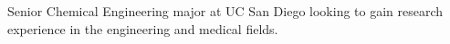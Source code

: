 \begin{cvparagraph}

Senior Chemical Engineering major at UC San Diego looking to gain research experience in the engineering and medical fields.
\end{cvparagraph}
